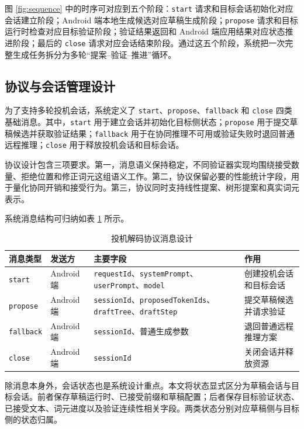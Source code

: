 图 \ref{fig:sequence} 中的时序可对应到五个阶段：\texttt{start} 请求和目标会话初始化对应会话建立阶段；Android 端本地生成候选对应草稿生成阶段；\texttt{propose} 请求和目标运行时检查对应目标验证阶段；验证结果返回和 Android 端应用结果对应状态推进阶段；最后的 \texttt{close} 请求对应会话结束阶段。通过这五个阶段，系统把一次完整生成任务拆分为多轮“提案--验证--推进”循环。

\subsection{协议与会话管理设计}

为了支持多轮投机会话，系统定义了 \texttt{start}、\texttt{propose}、\texttt{fallback} 和 \texttt{close} 四类基础消息。其中，\texttt{start} 用于建立会话并初始化目标侧状态；\texttt{propose} 用于提交草稿候选并获取验证结果；\texttt{fallback} 用于在协同推理不可用或验证失败时退回普通远程推理；\texttt{close} 用于释放投机会话和目标会话。

协议设计包含三项要求。第一，消息语义保持稳定，不同验证器实现均围绕接受数量、拒绝位置和修正词元这组语义工作。第二，协议保留必要的性能统计字段，用于量化协同开销和接受行为。第三，协议同时支持线性提案、树形提案和真实词元表示。

系统消息结构可归纳如表 \ref{tab:protocol} 所示。
\begin{table}[htbp]
  \centering
  \caption{投机解码协议消息设计}
  \label{tab:protocol}
  \small
  \begin{tabularx}{0.98\textwidth}{p{18mm}p{18mm}p{40mm}X}
    \toprule
    消息类型 & 发送方 & 主要字段 & 作用 \\
    \midrule
    \texttt{start} & Android 端 & \texttt{requestId}、\texttt{systemPrompt}、\texttt{userPrompt}、\texttt{model} & 创建投机会话和目标会话 \\
    \texttt{propose} & Android 端 & \texttt{sessionId}、\texttt{proposedTokenIds}、\texttt{draftTree}、\texttt{draftStep} & 提交草稿候选并请求验证 \\
    \texttt{fallback} & Android 端 & \texttt{sessionId}、普通生成参数 & 退回普通远程推理方案 \\
    \texttt{close} & Android 端 & \texttt{sessionId} & 关闭会话并释放资源 \\
    \bottomrule
  \end{tabularx}
\end{table}

除消息本身外，会话状态也是系统设计重点。本文将状态显式区分为草稿会话与目标会话。前者保存草稿运行时、已接受前缀和草稿配置；后者保存目标验证状态、已接受文本、词元进度以及验证连续性相关字段。两类状态分别对应草稿侧与目标侧的状态归属。

